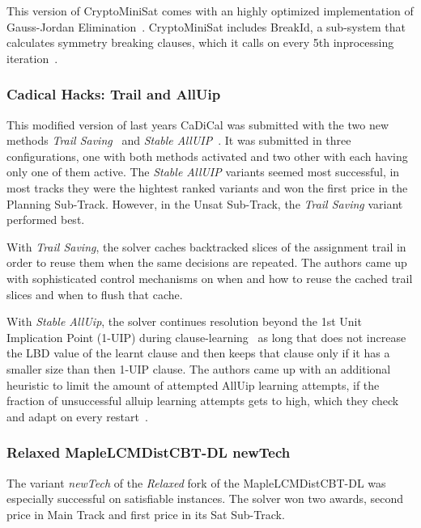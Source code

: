 \documentclass{elsarticle}
\begin{document}
This version of CryptoMiniSat comes with an highly optimized implementation of Gauss-Jordan Elimination~\cite{Soos:2020:CNFXOR}. 
CryptoMiniSat includes BreakId, a sub-system that calculates symmetry breaking clauses, which it calls on every 5th inprocessing iteration~\cite{Devriendt:2016:BreakId}.

\subsubsection{Cadical Hacks: Trail and AllUip}

This modified version of last years CaDiCal was submitted with the two new methods \emph{Trail Saving}~\cite{Hickey:2020:TrailSaving} and \emph{Stable AllUIP}~\cite{Bacchus:SC2020}. 
It was submitted in three configurations, one with both methods activated and two other with each having only one of them active. 
The \emph{Stable AllUIP} variants seemed most successful, in most tracks they were the hightest ranked variants and won the first price in the Planning Sub-Track. 
However, in the Unsat Sub-Track, the \emph{Trail Saving} variant performed best.

With \emph{Trail Saving}, the solver caches backtracked slices of the assignment trail in order to reuse them when the same decisions are repeated. 
The authors came up with sophisticated control mechanisms on when and how to reuse the cached trail slices and when to flush that cache. 

With \emph{Stable AllUip}, the solver continues resolution beyond the 1st Unit Implication Point (1-UIP) during clause-learning~\cite{Zhang:2001:ClauseLearning} as long that does not increase the LBD value of the learnt clause and then keeps that clause only if it has a smaller size than then 1-UIP clause. 
The authors came up with an additional heuristic to limit the amount of attempted AllUip learning attempts, if the fraction of unsuccessful alluip learning attempts gets to high, which they check and adapt on every restart~\cite{Bacchus:SC2020}. 


\subsubsection{Relaxed MapleLCMDistCBT-DL newTech}

The variant \emph{newTech} of the \emph{Relaxed} fork of the MapleLCMDistCBT-DL was especially successful on satisfiable instances. 
The solver won two awards, second price in Main Track and first price in its Sat Sub-Track.
\end{document}
